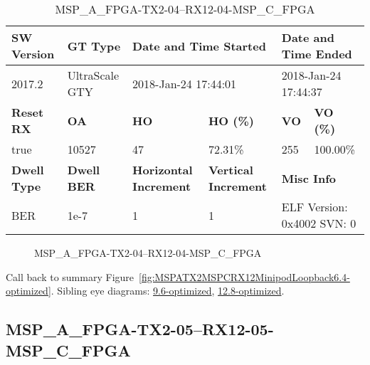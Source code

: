 \begin{table}[h]
\centering
\caption{MSP\_A\_FPGA-TX2-04--RX12-04-MSP\_C\_FPGA}
\label{tab:MSPAFPGATX204RX1204MSPCFPGA6.4-optimized}
\begin{tabular}{@{}|l|l|l|l|l|l|@{}}
\toprule
\textbf{SW Version}                & \textbf{GT Type}   & \multicolumn{2}{l|}{\textbf{Date and Time Started}}            & \multicolumn{2}{l|}{\textbf{Date and Time Ended}}        \\ \midrule
2017.2                       & UltraScale GTY          & \multicolumn{2}{l|}{2018-Jan-24 17:44:01}                   & \multicolumn{2}{l|}{2018-Jan-24 17:44:37}               \\ \midrule
\textbf{Reset RX}                  & \textbf{OA} & \textbf{HO}   & \textbf{HO (\%)} & \textbf{VO} & \textbf{VO (\%)} \\ \midrule
true & 10527        & 47          & 72.31\%        & 255        & 100.00\%       \\ \midrule
\textbf{Dwell Type}                & \textbf{Dwell BER} & \textbf{Horizontal Increment} & \textbf{Vertical Increment}    & \multicolumn{2}{l|}{\textbf{Misc Info}}                  \\ \midrule
BER                            & 1e-7        & 1        & 1           & \multicolumn{2}{l|}{ELF Version: 0x4002 SVN: 0}                         \\ \bottomrule
\end{tabular}
\end{table}

\begin{figure}[h]
\caption{MSP\_A\_FPGA-TX2-04--RX12-04-MSP\_C\_FPGA} \label{fig:MSPAFPGATX204RX1204MSPCFPGA6.4-optimized}
\end{figure}

Call back to summary Figure~\ref{fig:MSPATX2MSPCRX12MinipodLoopback6.4-optimized}.
Sibling eye diagrams: \hyperref[sec:MSPAFPGATX204RX1204MSPCFPGA9.6-optimized]{9.6-optimized}, \hyperref[sec:MSPAFPGATX204RX1204MSPCFPGA12.8-optimized]{12.8-optimized}.

\clearpage
\newpage


\subsection{MSP\_A\_FPGA-TX2-05--RX12-05-MSP\_C\_FPGA}\label{sec:MSPAFPGATX205RX1205MSPCFPGA6.4-optimized}

